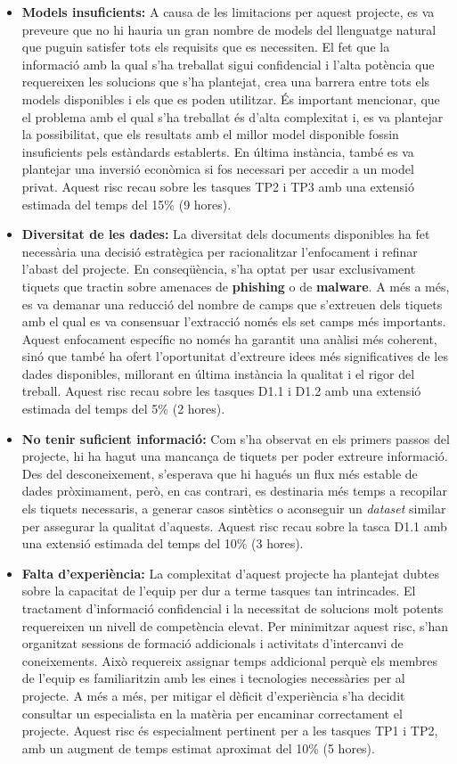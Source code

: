 \begin{itemize}
    \item \textbf{Models insuficients:} A causa de les limitacions per aquest projecte, es va preveure que no hi hauria un gran nombre de models del llenguatge natural que puguin satisfer tots els requisits que es necessiten. El fet que la informació amb la qual s'ha treballat sigui confidencial i l'alta potència que requereixen les solucions que s'ha plantejat, crea una barrera entre tots els models disponibles i els que es poden utilitzar. És important mencionar, que el problema amb el qual s'ha treballat és d'alta complexitat i, es va plantejar la possibilitat, que els resultats amb el millor model disponible fossin insuficients pels estàndards establerts. En última instància, també es va plantejar una inversió econòmica si fos necessari per accedir a un model privat. Aquest risc recau sobre les tasques TP2 i TP3 amb una extensió estimada del temps del 15\% (9 hores).
    \item \textbf{Diversitat de les dades:} La diversitat dels documents disponibles ha fet necessària una decisió estratègica per racionalitzar l'enfocament i refinar l'abast del projecte. En conseqüència, s'ha optat per usar exclusivament tiquets que tractin sobre amenaces de \textbf{phishing} o de \textbf{malware}. A més a més, es va demanar una reducció del nombre de camps que s'extreuen dels tiquets amb el qual es va consensuar l'extracció només els set camps més importants. Aquest enfocament específic no només ha garantit una anàlisi més coherent, sinó que també ha ofert l'oportunitat d'extreure idees més significatives de les dades disponibles, millorant en última instància la qualitat i el rigor del treball. Aquest risc recau sobre les tasques D1.1 i D1.2 amb una extensió estimada del temps del 5\% (2 hores).
    \item \textbf{No tenir suficient informació:} Com s'ha observat en els primers passos del projecte, hi ha hagut una mancança de tiquets per poder extreure informació. Des del desconeixement, s'esperava que hi hagués un flux més estable de dades pròximament, però, en cas contrari, es destinaria més temps a recopilar els tiquets necessaris, a generar casos sintètics o aconseguir un \textit{dataset} similar per assegurar la qualitat d'aquests. Aquest risc recau sobre la tasca D1.1 amb una extensió estimada del temps del 10\% (3 hores).
    \item \textbf{Falta d'experiència:} La complexitat d'aquest projecte ha plantejat dubtes sobre la capacitat de l'equip per dur a terme tasques tan intrincades. El tractament d'informació confidencial i la necessitat de solucions molt potents requereixen un nivell de competència elevat. Per minimitzar aquest risc, s'han organitzat sessions de formació addicionals i activitats d'intercanvi de coneixements. Això requereix assignar temps addicional perquè els membres de l'equip es familiaritzin amb les eines i tecnologies necessàries per al projecte. A més a més, per mitigar el dèficit d'experiència s'ha decidit consultar un especialista en la matèria per encaminar correctament el projecte. Aquest risc és especialment pertinent per a les tasques TP1 i TP2, amb un augment de temps estimat aproximat del 10\% (5 hores).

\end{itemize}
